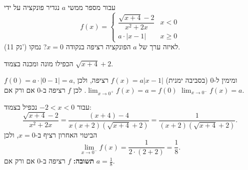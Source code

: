 
\begin{question}
עבור מספר ממשי $a$ נגדיר פונקציה על ידי
\[ f(x) = \begin{cases} \dfrac{\sqrt{x+4} - 2}{x^2 + 2x} & x < 0 \\ a\cdot|x - 1| & x \ge 0 \end{cases} \]
(11 נק') לאיזה ערך של $a$ הפונקציה רציפה בנקודה $x = 0$? נמקו.
\end{question}

\begin{hint}
הכפילו מונה ומכנה בצמוד $\sqrt{x+4} + 2$.
\end{hint}

\begin{solution}
$f(0) = a\cdot|0 - 1| = a$, ומימין ל-$0$ (בסביבה ימנית) $f(x) = a|x-1|$ רציפה, ולכן $\lim_{x\to0^+}f(x) = a = f(0)$.
לכן $f$ רציפה ב-$0$ אם ורק אם $\lim_{x\to 0^-} f(x) = a$.

עבור $-2 < x < 0$ נכפיל בצמוד:
\[ \frac{\sqrt{x+4} - 2}{x^2 + 2x} = \frac{(x + 4) - 4}{x(x+2)\left(\sqrt{x+4} + 2\right)} = \frac{1}{(x+2)\left(\sqrt{x+4}+2\right)}. \]
הביטוי האחרון רציף ב-$x=0$, ולכן
\[ \lim_{x\to 0^-} f(x) = \frac{1}{2\cdot(2 + 2)} = \frac18. \]
\textbf{תשובה:} $f$ רציפה ב-$0$ אם ורק אם $a = \frac18$.
\end{solution}
